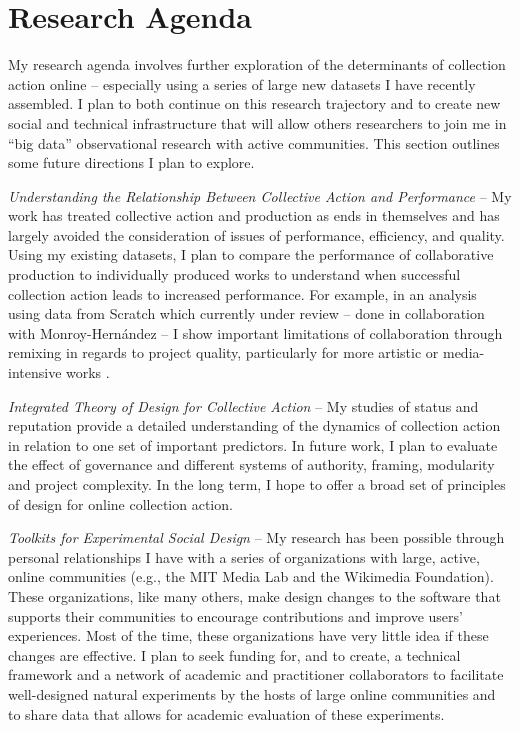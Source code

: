 \documentclass[10pt]{memoir}
\begin{document}

\section{Research Agenda}

My research agenda involves further exploration of the determinants of
collection action online -- especially using a series of large new
datasets I have recently assembled. I plan to both continue on this
research trajectory and to create new social and technical
infrastructure that will allow others researchers to join me in ``big
data'' observational research with active communities. This section
outlines some future directions I plan to explore.

\emph{Understanding the Relationship Between Collective Action and
  Performance} -- My work has treated collective action and production
as ends in themselves and has largely avoided the consideration of
issues of performance, efficiency, and quality. Using my existing
datasets, I plan to compare the performance of collaborative
production to individually produced works to understand when
successful collection action leads to increased performance. For
example, in an analysis using data from Scratch which currently under
review -- done in collaboration with Monroy-Hernández -- I show
important limitations of collaboration through remixing in regards to
project quality, particularly for more artistic or media-intensive
works \cite{hill_cost_2012}.

\emph{Integrated Theory of Design for Collective Action} -- My studies
of status and reputation provide a detailed understanding of the dynamics of
collection action in relation to one set of important predictors. In future
work, I plan to evaluate the effect of governance and different
systems of authority, framing, modularity and project complexity. In
the long term, I hope to offer a broad set of principles of
design for online collection action.

\emph{Toolkits for Experimental Social Design} -- My research has been
possible through personal relationships I have with a series of
organizations with large, active, online communities (e.g., the MIT
Media Lab and the Wikimedia Foundation). These organizations, like
many others, make design changes to the software that supports their
communities to encourage contributions and improve users'
experiences. Most of the time, these organizations have very little
idea if these changes are effective. I plan to seek funding for, and
to create, a technical framework and a network of academic and
practitioner collaborators to facilitate well-designed natural
experiments by the hosts of large online communities and to share data
that allows for academic evaluation of these experiments.
\end{document}
